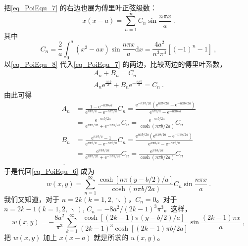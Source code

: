 \begin{example}{}
\begin{equation}
    \end{equation}
    把\autoref{eq_PoiEqu_7} 的右边也展为傅里叶正弦级数：
    \begin{equation} \label{eq_PoiEqu_8}
        x(x-a)=\sum_{n=1}^{\infty} C_{n} \sin \frac{n \pi x}{a}~.
    \end{equation}
    其中
    \begin{equation}
        C_{n}=\frac{2}{a} \int_{0}^{a}\left(x^{2}-a x\right) \sin \frac{n \pi x}{a} \mathrm{d} x=\frac{4 a^{2}}{n^{3} \pi^{3}}\left[(-1)^{n}-1\right]~,
    \end{equation}
    以\autoref{eq_PoiEqu_8} 代入\autoref{eq_PoiEqu_7} 的两边，比较两边的傅里叶系数，
    \begin{equation}
        \begin{array}{c}A_{n}+B_{n}=C_{n} \\ A_{n} \mathrm{e}^{\frac{n \pi b}{a}}+B_{n} \mathrm{e}^{-\frac{n \pi b}{a}}=C_{n}~.\end{array}
    \end{equation}
    由此可得
    \begin{equation}
        \begin{aligned}
            A_n&=\frac{1-\text{e}^{-n\pi b/a}}{\text{e}^{n\pi b/a}-\text{e}^{-n\pi b/a}}C_n=\frac{\text{e}^{-n\pi b/2a}\left( \text{e}^{n\pi b/2a}-\text{e}^{-n\pi b/2a} \right)}{\text{e}^{n\pi b/a}-\text{e}^{-n\pi b/a}}\\
            &=\frac{\text{e}^{-n\pi b/2a}}{\text{e}^{n\pi b/2a}+\text{e}^{-n\pi b/2a}}C_n=\frac{\text{e}^{-n\pi b/2a}}{\cosh \left( n\pi b/2a \right)}C_n\\
            B_n&=\frac{\text{e}^{n\pi b/a}-1}{\text{e}^{n\pi b/a}-\text{e}^{-n\pi b/a}}C_n=\frac{\text{e}^{n\pi b/2a}\left( \text{e}^{n\pi b/2a}-\text{e}^{-n\pi b/2a} \right)}{\text{e}^{n\pi b/a}-\text{e}^{-n\pi b/a}}\\
            &=\frac{\text{e}^{n\pi b/2a}}{\text{e}^{n\pi b/2a}+\text{e}^{-n\pi b/2a}}C_n=\frac{\text{e}^{n\pi b/2a}}{\cosh \left( n\pi b/2a \right)}C_n\\~.
        \end{aligned}
    \end{equation}
    于是代回\autoref{eq_PoiEqu_6} 成为
    \begin{equation}
        w(x, y)=\sum_{n=1}^{\infty} \frac{\cosh [n \pi(y-b / 2) / a]}{\cosh (n \pi b / 2 a)} C_{n} \sin \frac{n \pi x}{a}~.
    \end{equation}
    我们又知道，对于 $n=2k(k=1,2,\ddots)$，$C_n=0$。对于 $n=2k-1(k=1,2,\ddots)$, $C_n=-8a^2/(2k-1)^3\pi^3$。这样，
    \begin{equation}
        w(x, y)=-\frac{8 a^{2}}{\pi^{3}} \sum_{k=1}^{\infty} \frac{\cosh [(2 k-1) \pi(y-b / 2) / a]}{(2 k-1)^{3} \cosh [(2 k-1) \pi b / 2 a]} \sin \frac{(2 k-1) \pi x}{a}~,
    \end{equation}
    把 $w(x,y)$ 加上 $x(x-a)$ 就是所求的 $u(x,y)$。
\end{example}
